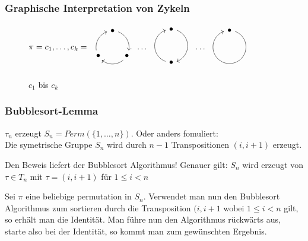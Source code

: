 \documentclass[12pt, german]{article}
\begin{document}
	\subsubsection{Graphische Interpretation von Zykeln}
	\begin{figure}[h!]
		\centering
		$ \pi = c_1, \ldots, c_k = \begin{array}{ccc}
			\begin{tikzpicture}[->,scale=.7] 
				\foreach \a/\t in {90/.,-30/.,210/.}{
					\node (\t) at (\a:1cm) {$\bullet$};
					\draw (\a-20:1cm)  arc (\a-20:\a-100:1cm);
				} 
			\end{tikzpicture}
		\end{array} \ldots
		\begin{array}{ccc}
			\begin{tikzpicture}[->,scale=.7] 
				\foreach \a/\t in {90/.,-90/.}{
					\node (\t) at (\a:1cm) {$\bullet$};
					\draw (\a-20:1cm)  arc (\a-20:\a-160:1cm);
				} 
			\end{tikzpicture}
		\end{array}
		\ldots
		\begin{array}{ccc}
			\begin{tikzpicture}[->,scale=.7] 
				\foreach \a/\t in {90/.}{
					\node (\t) at (\a:1cm) {$\bullet$};
					\draw (\a-20:1cm)  arc (\a-20:\a-340:1cm);
				} 
			\end{tikzpicture}
		\end{array}$
		\caption{$c_1$ bis $c_k$}
	\end{figure}
	
	\subsubsection{Bubblesort-Lemma}
	$\tau_n$ erzeugt $S_n = Perm(\{1, \ldots, n\})$. Oder anders fomuliert: \\
	Die symetrische Gruppe $S_n$ wird durch $n-1$ Transpositionen $(i, i+1)$ erzeugt.
	\newline
	
	Den Beweis liefert der Bubblesort Algorithmus! 
	Genauer gilt: $S_n$ wird erzeugt von $\tau \in T_n$ mit $\tau= (i, i+1)$ für $1 \leq i < n$
	\newline
	
	Sei $\pi$ eine beliebige permutation in $S_n$. Verwendet man nun den Bubblesort Algorithmus zum sortieren durch die Transposition $(i, i+1$ wobei $1 \leq i <n $ gilt, so erhält man die Identität. Man führe nun den Algorithmus rückwärts aus, starte also bei der Identität, so kommt man zum gewünschten Ergebnis.
	
\end{document}

